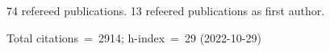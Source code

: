 74 refereed publications. 13 refeered publications as first author.

Total citations~=~2914; h-index~=~29 (2022-10-29)